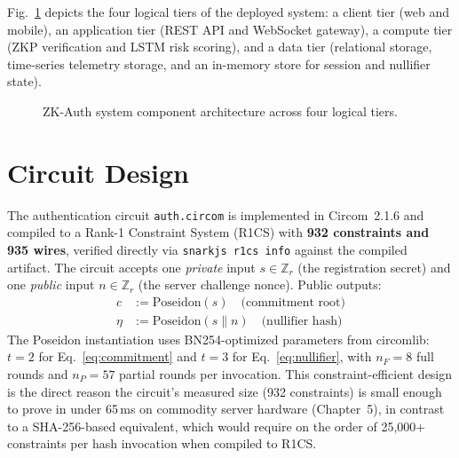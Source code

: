 \documentclass[12pt,a4paper,oneside]{report}
\begin{document}
Fig.~\ref{fig:system_overview} depicts the four logical tiers of the
deployed system: a client tier (web and mobile), an application tier
(REST API and WebSocket gateway), a compute tier (ZKP verification and
LSTM risk scoring), and a data tier (relational storage, time-series
telemetry storage, and an in-memory store for session and nullifier
state).

\begin{figure}[htbp]
\centering
{}
\caption{ZK-Auth system component architecture across four logical tiers.}
\label{fig:system_overview}
\end{figure}

\section{Circuit Design}

The authentication circuit \texttt{auth.circom} is implemented in
Circom~2.1.6 and compiled to a Rank-1 Constraint System (R1CS) with
\textbf{932 constraints and 935 wires}, verified directly via
\texttt{snarkjs r1cs info} against the compiled artifact. The circuit
accepts one \emph{private} input $s \in \mathbb{Z}_r$ (the registration
secret) and one \emph{public} input $n \in \mathbb{Z}_r$ (the server
challenge nonce). Public outputs:
\begin{align}
  c &:= \text{Poseidon}(s) \quad\text{(commitment root)} \label{eq:commitment} \\
  \eta &:= \text{Poseidon}(s \| n) \quad\text{(nullifier hash)} \label{eq:nullifier}
\end{align}
The Poseidon instantiation uses BN254-optimized parameters from
circomlib: $t=2$ for Eq.~\ref{eq:commitment} and $t=3$ for
Eq.~\ref{eq:nullifier}, with $n_F=8$ full rounds and $n_P=57$ partial
rounds per invocation. This constraint-efficient design is the direct
reason the circuit's measured size (932 constraints) is small enough to
prove in under 65\,ms on commodity server hardware (Chapter~5), in
contrast to a SHA-256-based equivalent, which would require on the order
of 25{,}000+ constraints per hash invocation when compiled to R1CS.
\end{document}
